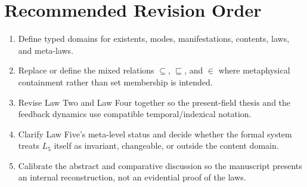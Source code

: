 \documentclass[11pt]{article}
\begin{document}
\section*{Recommended Revision Order}

\begin{enumerate}
    \item Define typed domains for existents, modes, manifestations, contents, laws, and meta-laws.
    \item Replace or define the mixed relations $\subseteq$, $\sqsubseteq$, and $\in$ where metaphysical containment rather than set membership is intended.
    \item Revise Law Two and Law Four together so the present-field thesis and the feedback dynamics use compatible temporal/indexical notation.
    \item Clarify Law Five's meta-level status and decide whether the formal system treats $L_5$ itself as invariant, changeable, or outside the content domain.
    \item Calibrate the abstract and comparative discussion so the manuscript presents an internal reconstruction, not an evidential proof of the laws.
\end{enumerate}
\end{document}
